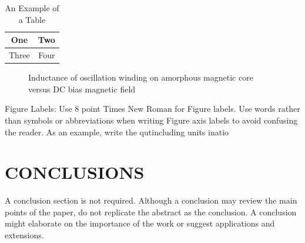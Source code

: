 \documentclass[letterpaper, 10 pt, conference]{ieeeconf}  %
\begin{document}
\begin{itemize}
\begin{table}[h]
\caption{An Example of a Table}
\label{table_example}
\begin{center}
\begin{tabular}{|c||c|}
\hline
One & Two\\
\hline
Three & Four\\
\hline
\end{tabular}
\end{center}
\end{table}


   \begin{figure}[thpb]
      \centering
      \caption{Inductance of oscillation winding on amorphous
       magnetic core versus DC bias magnetic field}
      \label{figurelabel}
   \end{figure}
   

Figure Labels: Use 8 point Times New Roman for Figure labels. Use words rather than symbols or abbreviations when writing Figure axis labels to avoid confusing the reader. As an example, write the qutincluding units inatio

\section{CONCLUSIONS}

A conclusion section is not required. Although a conclusion may review the main points of the paper, do not replicate the abstract as the conclusion. A conclusion might elaborate on the importance of the work or suggest applications and extensions. 

\addtolength{\textheight}{-12cm}   %





\end{itemize}
\end{document}
